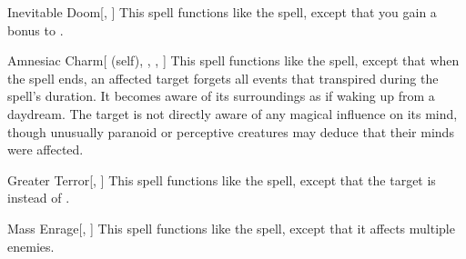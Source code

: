 \lowercase{\hypertarget{spell:Inevitable Doom}{}}\label{spell:Inevitable Doom}
\begin{freeability}[\nth{4}]{\hypertarget{spell:Inevitable Doom}{Inevitable Doom}}[, ]
This spell functions like the  spell, except that you gain a  bonus to .
\end{freeability}
\vspace{0.25em}



\lowercase{\hypertarget{spell:Amnesiac Charm}{}}\label{spell:Amnesiac Charm}
\begin{attuneability}[\nth{5}]{\hypertarget{spell:Amnesiac Charm}{Amnesiac Charm}}[ (self), , , ]
This spell functions like the  spell, except that when the spell ends, an affected target forgets all events that transpired during the spell's duration.
It becomes aware of its surroundings as if waking up from a daydream.
The target is not directly aware of any magical influence on its mind, though unusually paranoid or perceptive creatures may deduce that their minds were affected.
\end{attuneability}
\vspace{0.25em}



\lowercase{\hypertarget{spell:Greater Terror}{}}\label{spell:Greater Terror}
\begin{freeability}[\nth{5}]{\hypertarget{spell:Greater Terror}{Greater Terror}}[, ]
This spell functions like the  spell, except that the target is  instead of .
\end{freeability}
\vspace{0.25em}



\lowercase{\hypertarget{spell:Mass Enrage}{}}\label{spell:Mass Enrage}
\begin{freeability}[\nth{5}]{\hypertarget{spell:Mass Enrage}{Mass Enrage}}[, ]
This spell functions like the  spell, except that it affects multiple enemies.
\end{freeability}
\vspace{0.25em}



